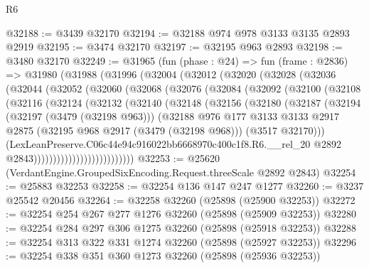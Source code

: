 \begin{lexlean}{R6}
\begin{coremodule}
@32188 := @3439 @32170
@32194 := @32188 @974 @978 @3133 @3135 @2893 @2919
@32195 := @3474 @32170
@32197 := @32195 @963 @2893
@32198 := @3480 @32170
@32249 := @31965
    (fun (phase : @24) =>
    fun (frame : @2836) =>
    @31980
      (@31988
        (@31996
          (@32004
            (@32012
              (@32020
                (@32028
                  (@32036
                    (@32044
                      (@32052
                        (@32060
                          (@32068
                            (@32076
                              (@32084
                                (@32092
                                  (@32100
                                    (@32108
                                      (@32116
                                        (@32124
                                          (@32132
                                            (@32140
                                              (@32148
                                                (@32156
                                                  (@32180
                                                    (@32187
                                                      (@32194
                                                        (@32197 (@3479 (@32198 @963)))
                                                        (@32188
                                                          @976
                                                          @177
                                                          @3133
                                                          @3133
                                                          @2917
                                                          @2875
                                                          (@32195 @968 @2917 (@3479 (@32198 @968)))
                                                          (@3517 @32170)))
                                                      (LexLeanPreserve.C06c44e94c916022bb6668970c400c1f8.R6.__rel_20
                                                        @2892
                                                        @2843))))))))))))))))))))))))))
@32253 := @25620 (VerdantEngine.GroupedSixEncoding.Request.threeScale @2892 @2843)
@32254 := @25883 @32253
@32258 := @32254 @136 @147 @247 @1277
@32260 := @3237 @25542 @20456
@32264 := @32258 @32260 (@25898 (@25900 @32253))
@32272 := @32254 @254 @267 @277 @1276 @32260 (@25898 (@25909 @32253))
@32280 := @32254 @284 @297 @306 @1275 @32260 (@25898 (@25918 @32253))
@32288 := @32254 @313 @322 @331 @1274 @32260 (@25898 (@25927 @32253))
@32296 := @32254 @338 @351 @360 @1273 @32260 (@25898 (@25936 @32253))

\end{coremodule}
\end{lexlean}
